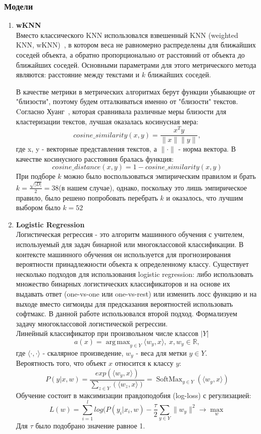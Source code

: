 \documentclass{article}
\DeclareMathOperator*{\argmax}{arg\,max}
\DeclareMathOperator*{\softmax}{SoftMax}
\begin{document}
\subsubsection{Модели}
\begin{enumerate}
    \item{\bfseries wKNN} \\
    Вместо классического KNN использовался взвешенный KNN (weighted KNN, wKNN)~\cite{dudani}, в котором веса не равномерно распределены для ближайших соседей объекта, а обратно пропорционально от расстояний от объекта до ближайших соседей. Основными параметрами для этого метрического метода являются: расстояние между текстами и $k$ ближайших соседей.

    В качестве метрики в метрических алгоритмах берут функции убывающие от "близости"{}, поэтому будем отталкиваться именно от "близости"{} текстов. Cогласно Хуанг~\cite{huang}, которая сравнивала различные меры близости для кластеризации текстов, лучшая оказалась косинусная мера:
    $$
    cosine\_similarity(x, y) = \frac{x^{T}y}{\|x\| \|y\|},
    $$ где x, y - векторные представления текстов, а $\|\cdot\|$ - норма вектора. В качестве косинусного расстояния бралась функция:
    $$
    cosine\_distance(x, y) = 1 - cosine\_similarity(x, y)
    $$
    При подборе $k$ можно было воспользоваться эмпирическим правилом и брать $k = \frac{\sqrt{|D|}}{2} = 38$(в нашем случае), однако, поскольку это лишь эмпирическое правило, было решено попробовать перебрать $k$ и оказалось, что лучшим выбором было $k = 52$
    
    \item{\bfseries Logistic Regression} \\
    Логистическая регрессия - это алгоритм машинного обучения с учителем, используемый для задач бинарной или многоклассовой классификации. В контексте машинного обучения он используется для прогнозирования вероятности принадлежности объекта к определенному классу. Существует несколько подходов для использования logistic regression: либо использовать множество бинарных логистических классификаторов и на основе их выдавать ответ (one-vs-one или one-vs-rest) или изменить лосс функцию и на выходе вместо сигмоиды для предсказания вероятностей использовать софтмакс. В данной работе использовался второй подход. Формализуем задачу многоклассовой логистической регрессии. \\
    
     Линейный классификатор при произвольном числе классов $|Y|$   
        $$
        a(x) = \argmax_{y \in Y}\langle w_y, x\rangle,\ x, w_y \in \mathbb{R},
        $$
        где $\langle \cdot, \cdot \rangle$ - скалярное произведение, $w_y$ - веса для метки $y \in Y$.\\
    Вероятность того, что объект $x$ относится к классу $y$:
        $$
        P(y|x, w) = \frac{exp(\langle w_y, x\rangle)}{\sum_{z \in Y}(\langle w_z, x\rangle)} = 
        \softmax_{y \in Y}(\langle w_y, x \rangle)
        $$
    Обучение состоит в максимизации правдоподобия (log-loss) с регулизацией:
    $$
        L(w) = \sum_{i=1}^{l}log(P(y_i|x_i, w) - \frac{\tau}{2}\sum_{y \in Y}\|w_y\|^2 \rightarrow \max_w
    $$
    Для $\tau$ было подобрано значение равное 1.


\end{enumerate}
\end{document}
